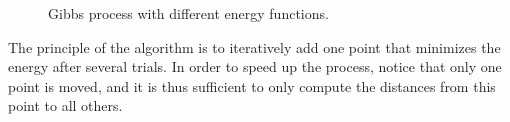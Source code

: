 \begin{figure}[htbp]
\centering
{}\hfill
{}\hfill
{}
\caption{Gibbs process with different energy functions.}
\label{fig:point_process_generation:matlab:gibbs}
\end{figure}

The principle of the algorithm is to iteratively add one point that minimizes the energy after several trials. In order to speed up the process, notice that only one point is moved, and it is thus sufficient to only compute the distances from this point to all others.

